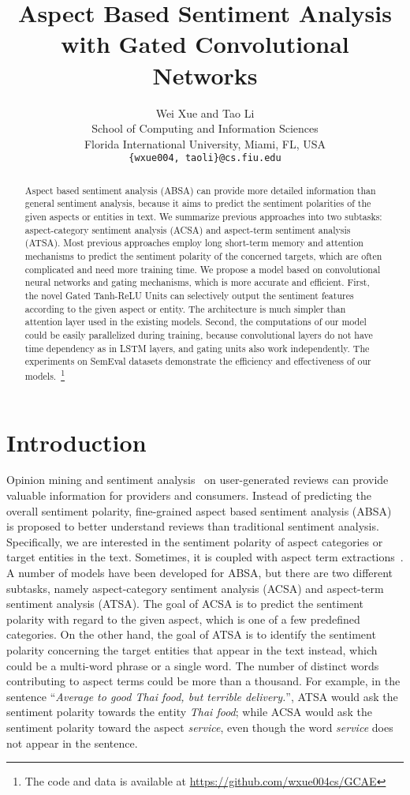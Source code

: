 \documentclass[11pt,a4paper]{article}
\title{Aspect Based Sentiment Analysis with Gated Convolutional Networks}
\author{Wei Xue \textnormal{and} Tao Li \\
  School of Computing and Information Sciences \\
  Florida International University, Miami, FL, USA \\
  {\tt {\{wxue004, taoli\}@cs.fiu.edu}}
  }
\date{}
\begin{document}
\maketitle

\begin{abstract}
Aspect based sentiment analysis (ABSA) can provide more detailed information than general sentiment analysis, because it aims to predict the sentiment polarities of the given aspects or entities in text. We summarize previous approaches into two subtasks: aspect-category sentiment analysis (ACSA) and aspect-term sentiment analysis (ATSA). Most previous approaches employ long short-term memory and attention mechanisms to predict the sentiment polarity of the concerned targets, which are often complicated and need more training time.
We propose a model based on convolutional neural networks and gating mechanisms, which is more accurate and efficient. First, the novel Gated Tanh-ReLU Units can selectively output the sentiment features according to the given aspect or entity. The architecture is much simpler than attention layer used in the existing models. Second, the computations of our model could be easily parallelized during training, because convolutional layers do not have time dependency as in LSTM layers, and gating units also work independently.
The experiments on SemEval datasets demonstrate the efficiency and effectiveness of our models.~\footnote{The code and data is available at \url{https://github.com/wxue004cs/GCAE}}
\end{abstract}

\section{Introduction}
Opinion mining and sentiment analysis~\cite{Pang:2008wj} on user-generated reviews can provide valuable information for providers and consumers. Instead of predicting the overall sentiment polarity, fine-grained aspect based sentiment analysis (ABSA)~\cite{Liu:2012ke} is proposed to better understand reviews than traditional sentiment analysis. Specifically, we are interested in the sentiment polarity of aspect categories or target entities in the text. Sometimes, it is coupled with aspect term extractions~\cite{xue2017mtna}. 
A number of models have been developed for ABSA, but there are two different subtasks, namely aspect-category sentiment analysis (ACSA) and aspect-term sentiment analysis (ATSA). The goal of ACSA is to predict the sentiment polarity with regard to the given aspect, which is one of a few predefined categories. On the other hand, the goal of ATSA is to identify the sentiment polarity concerning the target entities that appear in the text instead, which could be a multi-word phrase or a single word. The number of distinct words contributing to aspect terms could be more than a thousand. For example, in the sentence ``\textit{Average to good Thai food, but terrible delivery.}'',  ATSA would ask the sentiment polarity towards the entity \textit{Thai food}; while ACSA would ask the sentiment polarity toward the aspect \textit{service}, even though the word \textit{service} does not appear in the sentence.
\end{document}
